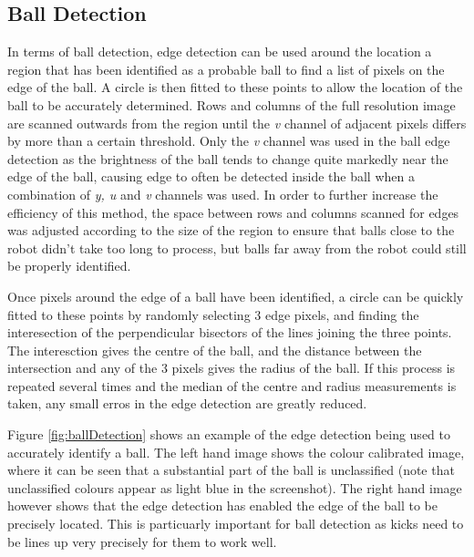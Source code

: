 \documentclass[runningheads,a4paper]{llncs}
\begin{document}
\subsection{Ball Detection}

In terms of ball detection, edge detection can be used around the location a region that has been identified as a probable ball to find a list of pixels on the edge of the ball. A circle is then fitted to these points to allow the location of the ball to be accurately determined. Rows and columns of the full resolution image are scanned outwards from the region until the \emph{v} channel of adjacent pixels differs by more than a certain threshold. Only the \emph{v} channel was used in the ball edge detection as the brightness of the ball tends to change quite markedly near the edge of the ball, causing edge to often be detected inside the ball when a combination of \emph{y, u} and \emph{v} channels was used. In order to further increase the efficiency of this method, the space between rows and columns scanned for edges was adjusted according to the size of the region to ensure that balls close to the robot didn't take too long to process, but balls far away from the robot could still be properly identified.

Once pixels around the edge of a ball have been identified, a circle can be quickly fitted to these points by randomly selecting 3 edge pixels, and finding the interesection of the perpendicular bisectors of the lines joining the three points. The interesction gives the centre of the ball, and the distance between the intersection and any of the 3 pixels gives the radius of the ball. If this process is repeated several times and the median of the centre and radius measurements is taken, any small erros in the edge detection are greatly reduced.

Figure \ref{fig:ballDetection} shows an example of the edge detection being used to accurately identify a ball. The left hand image shows the colour calibrated image, where it can be seen that a substantial part of the ball is unclassified (note that unclassified colours appear as light blue in the screenshot). The right hand image however shows that the edge detection has enabled the edge of the ball to be precisely located. This is particuarly important for ball detection as kicks need to be lines up very precisely for them to work well.
\end{document}
